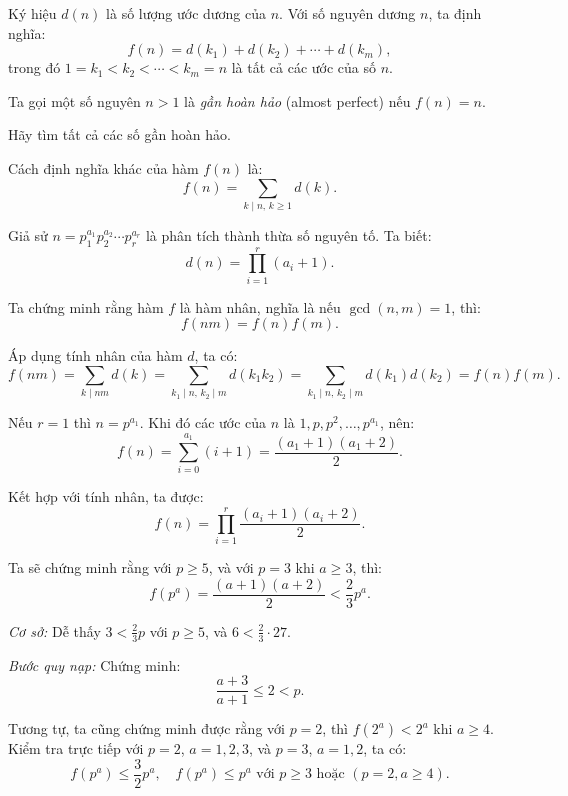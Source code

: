 \ifshowproblemandsoln
\ifshowproblem\begin{problem}\label{problem:EMC-2015-J-P3}\fi
\ifshowsoln\begin{problem}\fi
    Ký hiệu \( d(n) \) là số lượng ước dương của \( n \).  
    Với số nguyên dương \( n \), ta định nghĩa:
    \[
        f(n) = d(k_1) + d(k_2) + \cdots + d(k_m),
    \]
    trong đó \( 1 = k_1 < k_2 < \cdots < k_m = n \) là tất cả các ước của số \( n \).
    
    Ta gọi một số nguyên \( n > 1 \) là \textit{gần hoàn hảo} (almost perfect) nếu \( f(n) = n \).
    
    Hãy tìm tất cả các số gần hoàn hảo.    
\end{problem}
\fi

\ifshowsoln
\begin{soln}\footnotemark
    Cách định nghĩa khác của hàm \( f(n) \) là:
    \[
        f(n) = \sum_{k \mid n,\, k \ge 1} d(k).
    \]
    
    Giả sử \( n = p_1^{a_1} p_2^{a_2} \cdots p_r^{a_r} \) là phân tích thành thừa số nguyên tố. Ta biết:
    \[
        d(n) = \prod_{i=1}^r (a_i + 1).
    \]

    Ta chứng minh rằng hàm \( f \) là hàm nhân, nghĩa là nếu \( \gcd(n, m) = 1 \), thì:
    \[
        f(nm) = f(n)f(m).
    \]

    Áp dụng tính nhân của hàm \( d \), ta có:
    \[
        f(nm) = \sum_{k \mid nm} d(k) = \sum_{k_1 \mid n,\, k_2 \mid m} d(k_1 k_2) = \sum_{k_1 \mid n,\, k_2 \mid m} d(k_1)d(k_2) = f(n)f(m).
    \]

    Nếu \( r = 1 \) thì \( n = p^{a_1} \). Khi đó các ước của \( n \) là \( 1, p, p^2, \ldots, p^{a_1} \), nên:
    \[
        f(n) = \sum_{i = 0}^{a_1} (i + 1) = \frac{(a_1 + 1)(a_1 + 2)}{2}.
    \]

    Kết hợp với tính nhân, ta được:
    \[
        f(n) = \prod_{i = 1}^r \frac{(a_i + 1)(a_i + 2)}{2}.
    \]

    Ta sẽ chứng minh rằng với \( p \ge 5 \), và với \( p = 3 \) khi \( a \ge 3 \), thì:
    \[
        f(p^a) = \frac{(a+1)(a+2)}{2} < \frac{2}{3}p^a.
    \]

    \textit{Cơ sở:} Dễ thấy \( 3 < \frac{2}{3}p \) với \( p \ge 5 \), và \( 6 < \frac{2}{3} \cdot 27 \).

    \textit{Bước quy nạp:} Chứng minh:
    \[
        \frac{a+3}{a+1} \le 2 < p.
    \]

    Tương tự, ta cũng chứng minh được rằng với \( p = 2 \), thì \( f(2^a) < 2^a \) khi \( a \ge 4 \).
    Kiểm tra trực tiếp với \( p = 2 \), \( a = 1, 2, 3 \), và \( p = 3 \), \( a = 1, 2 \), ta có:
    \[
        f(p^a) \le \frac{3}{2}p^a, \quad f(p^a) \le p^a \text{ với } p \ge 3 \text{ hoặc } (p = 2, a \ge 4).
    \]


\end{soln}
\end{problem}
